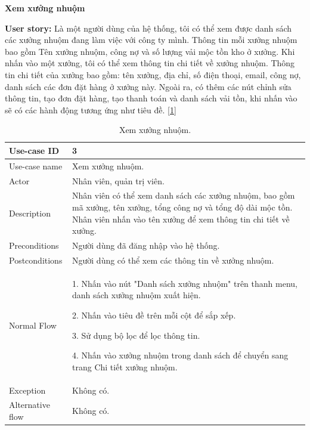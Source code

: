 \newpage
\textbf{Xem xưởng nhuộm}\par
\textbf{User story:} Là một người dùng của hệ thống, tôi có thể xem được danh sách các xưởng nhuộm đang làm việc với công ty mình. Thông tin mỗi xưởng nhuộm bao gồm Tên xưởng nhuộm, công nợ và số lượng vải mộc tồn kho ở xưởng. Khi nhấn vào một xưởng, tôi có thể xem thông tin chi tiết về xưởng nhuộm. Thông tin chi tiết của xưởng bao gồm: tên xưởng, địa chỉ, số điện thoại, email, công nợ, danh sách các đơn đặt hàng ở xưởng này. Ngoài ra, có thêm các nút chỉnh sửa thông tin, tạo đơn đặt hàng, tạo thanh toán và danh sách vải tồn, khi nhấn vào sẽ có các hành động tương ứng như tiêu đề. [\ref{bang3}]
\begin{table}[!htp]
    \centering
    \begin{tabular}{|m{3cm}|m{10cm}|}
    \hline 
        Use-case ID & 3\\ \hline
        Use-case name & Xem xưởng nhuộm.\\ \hline
        Actor & Nhân viên, quản trị viên.\\ \hline
        Description & Nhân viên có thể xem danh sách các xưởng nhuộm, bao gồm mã xưởng, tên xưởng, tổng công nợ và tổng độ dài mộc tồn. Nhân viên nhấn vào tên xưởng để xem thông tin chi tiết về xưởng.\\ \hline
        Preconditions & Người dùng đã đăng nhập vào hệ thống.\\ \hline
        Postconditions & Người dùng có thể xem các thông tin về xưởng nhuộm.\\ \hline
        Normal Flow & 
        1. Nhấn vào nút "Danh sách xưởng nhuộm" trên thanh menu, danh sách xưởng nhuộm xuất hiện.\par
        2. Nhấn vào tiêu đề trên mỗi cột để sắp xếp.\par
        3. Sử dụng bộ lọc để lọc thông tin.\par
        4. Nhấn vào xưởng nhuộm trong danh sách để chuyển sang trang Chi tiết xưởng nhuộm.\par
        \\ \hline
        Exception & Không có.\\ \hline
        Alternative flow & 
        Không có. \par
        \\ 
    \hline 
    \end{tabular}
    \caption{Xem xưởng nhuộm.}
    \label{bang3}
\end{table}

